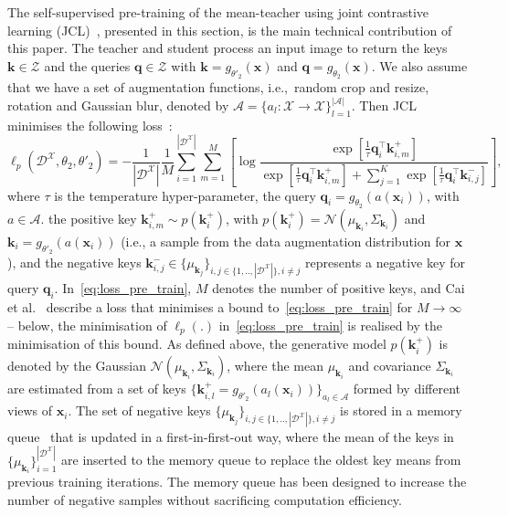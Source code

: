 \documentclass[runningheads]{llncs}
\begin{document}
The self-supervised pre-training of the mean-teacher using joint contrastive learning (JCL)~\cite{cai2020joint}, presented in this section, is the main technical contribution of this paper. 
The teacher and student process an input image to return the keys $\mathbf{k}\in\mathcal{Z}$ and the queries $\mathbf{q}\in\mathcal{Z}$ with $\mathbf{k}=g_{\theta'_2}(\mathbf{x})$ and $\mathbf{q}=g_{\theta_2}(\mathbf{x})$. We also assume that we have a set of augmentation functions, i.e.,~random crop and resize, rotation and Gaussian blur, denoted by $\mathcal{A}=\{ a_l:\mathcal{X} \rightarrow \mathcal{X} \}_{l=1}^{|\mathcal{A}|}$.    
Then JCL minimises the following loss~\cite{cai2020joint}:
\begin{equation}
    {
    \ell_{p}(\mathcal{D}^{\mathcal{X}},\theta_2,\theta'_2)=
    -\frac{1}{|\mathcal{D}^{\mathcal{X}}|}
    \frac{1}{M}
    \sum_{i=1}^{|\mathcal{D}^{\mathcal{X}}|}
    \sum_{m=1}^{M}
    \left [
    \log\frac{\exp\left[ \frac{1}{\tau} \mathbf{q}_i^{\top} \mathbf{k}_{i,m}^{+} \right]}{\exp\left[ \frac{1}{\tau} \mathbf{q}_i^{\top} \mathbf{k}_{i,m}^{+} \right] + \sum_{j=1}^K \exp\left[ \frac{1}{\tau}  \mathbf{q}_i^{\top} \mathbf{k}_{i,j}^{-} \right]}
    \right ],}
    \label{eq:loss_pre_train}
\end{equation}
where $\tau$ is the temperature hyper-parameter, the query $\mathbf{q}_i = g_{\theta_2}(a(\mathbf{x}_i))$, with $a \in \mathcal{A}$.
the positive key $\mathbf{k}_{i,m}^{+} \sim p(\mathbf{k}_i^{+})$, with $p(\mathbf{k}_i^{+}) = \mathcal{N}(\mu_{\mathbf{k}_i},\Sigma_{\mathbf{k}_i})$ and $\mathbf{k}_i = g_{\theta'_2}(a(\mathbf{x}_i))$ (i.e., a sample from the data augmentation distribution for $\mathbf{x}$), and the negative keys $\mathbf{k}_{i,j}^{-} \in \{ \mu_{\mathbf{k}_j} \}_{i,j \in \{1,..,|\mathcal{D}^{\mathcal{X}}|\}, i \ne j }$ represents a negative key for query $\mathbf{q}_i$. 
In~\eqref{eq:loss_pre_train}, $M$ denotes the number of positive keys, and Cai et al.~\cite{cai2020joint} describe a loss that minimises a bound to~\eqref{eq:loss_pre_train} for $M \to \infty$ -- below, the minimisation of $\ell_p(.)$ in~\eqref{eq:loss_pre_train} is realised by the minimisation of this bound.
As defined above, the generative model $p(\mathbf{k}_i^{+})$ is denoted by the Gaussian 
$\mathcal{N}(\mu_{\mathbf{k}_i},\Sigma_{\mathbf{k}_i})$, where the mean $\mu_{\mathbf{k}_i}$ and covariance $\Sigma_{\mathbf{k}_i}$ are estimated from a set of keys $\{ \mathbf{k}^{+}_{i,l} = g_{\theta'_2}(a_l(\mathbf{x}_i))  \}_{a_l \in \mathcal{A}}$ formed by different views of $\mathbf{x}_i$.
The set of negative keys $\{ \mu_{\mathbf{k}_j} \}_{i,j \in \{1,..,|\mathcal{D}^{\mathcal{X}}|\}, i \ne j }$ is stored in a memory queue~\cite{moco} that is updated in a first-in-first-out way, where the mean of the keys in $\{ \mu_{\mathbf{k}_i} \}_{i=1}^{|\mathcal{D}^{\mathcal{X}}|} $ are inserted to the memory queue to replace the oldest key means from previous training iterations. The memory queue has been designed to increase the number of negative samples without sacrificing computation efficiency. 
\end{document}
